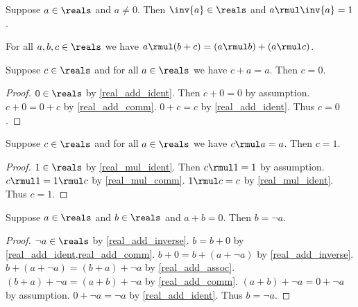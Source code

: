 \begin{axiom}\label{real_mul_inverse}
    Suppose $a\in\reals$ and $a\neq 0$.
    Then $\inv{a}\in\reals$ and $a \rmul \inv{a} = 1$.
\end{axiom}

\begin{axiom}\label{real_distrib}
    For all $a, b, c\in\reals$ we have $a \rmul (b + c) = (a \rmul b) + (a \rmul c)$.
\end{axiom}

\begin{theorem}\label{real_add_ident_unique}
    Suppose $c\in\reals$ and for all $a\in\reals$ we have $c + a = a$.
    Then $c = 0$.
\end{theorem}
\begin{proof}
    $0\in\reals$ by \cref{real_add_ident}.
    Then $c + 0 = 0$ by assumption.
    $c + 0 = 0 + c$ by \cref{real_add_comm}.
    $0 + c = c$ by \cref{real_add_ident}.
    Thus $c = 0$.
\end{proof}

\begin{theorem}\label{real_mul_ident_unique}
    Suppose $c\in\reals$ and for all $a\in\reals$ we have $c \rmul a = a$.
    Then $c = 1$.
\end{theorem}
\begin{proof}
    $1\in\reals$ by \cref{real_mul_ident}.
    Then $c \rmul 1 = 1$ by assumption.
    $c \rmul 1 = 1 \rmul c$ by \cref{real_mul_comm}.
    $1 \rmul c = c$ by \cref{real_mul_ident}.
    Thus $c = 1$.
\end{proof}

\begin{theorem}\label{real_add_inverse_unique}
    Suppose $a\in\reals$ and $b\in\reals$ and $a + b = 0$.
    Then $b = \neg{a}$.
\end{theorem}
\begin{proof}
    $\neg{a}\in\reals$ by \cref{real_add_inverse}.
    $b = b + 0$ by \cref{real_add_ident,real_add_comm}.
    $b + 0 = b + (a + \neg{a})$ by \cref{real_add_inverse}.
    $b + (a + \neg{a}) = (b + a) + \neg{a}$ by \cref{real_add_assoc}.
    $(b + a) + \neg{a} = (a + b) + \neg{a}$ by \cref{real_add_comm}.
    $(a + b) + \neg{a} = 0 + \neg{a}$ by assumption.
    $0 + \neg{a} = \neg{a}$ by \cref{real_add_ident}.
    Thus $b = \neg{a}$.
\end{proof}

